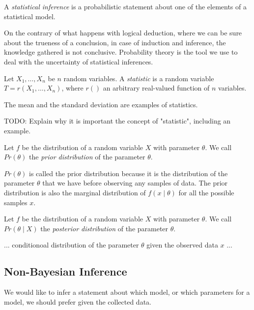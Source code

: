 \begin{definition}
    A \emph{statistical inference} is a probabilistic statement about one of the elements of a statistical model.
\end{definition}

On the contrary of what happens with logical deduction, where we can be sure about the trueness of a conclusion, in case of induction and inference, the knowledge gathered is not conclusive. Probability theory is the tool we use to deal with the uncertainty of statistical inferences.

\begin{definition}
    Let $X_1, \ldots, X_n$ be $n$ random variables. A \emph{statistic} is a random variable $T = r \left( X_1, \ldots, X_n \right)$, where $r()$ an arbitrary real-valued function of $n$ variables.
\end{definition}

The mean and the standard deviation are examples of statistics.

    {\color{red} TODO: Explain why it is important the concept of "statistic", including an example.}

\begin{definition}
    Let $f$ be the distribution of a random variable $X$ with parameter $\theta$. We call $Pr(\theta)$ the \emph{prior distribution} of the parameter $\theta$.
\end{definition}

$Pr(\theta)$ is called the prior distribution because it is the distribution of the parameter $\theta$ that we have before observing any samples of data. The prior distribution is also the marginal distribution of $f(x \mid \theta)$ for all the possible samples $x$.

\begin{definition}
    Let $f$ be the distribution of a random variable $X$ with parameter $\theta$. We call $Pr(\theta \mid X)$ the \emph{posterior distribution} of the parameter $\theta$.
\end{definition}

... conditionoal distribution of the parameter $\theta$ given the observed data $x$ ...


\subsection{Non-Bayesian Inference}

We would like to infer a statement about which model, or which parameters for a model, we should prefer given the collected data.

